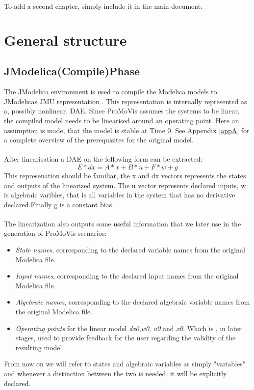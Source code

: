 To add a second chapter, simply include it in the main document.

\section{General structure}
\subsection{JModelica(Compile)Phase}
The JModelica environment is used to compile the Modelica models to JModelicas JMU representation \cite{jmodelicaorg}\nocite{*}. This representation is internally represented as a, possibly nonlinear, DAE. Since ProMoVis assumes the systems to be linear, the compiled model needs to be linearised around an operating point. Here an assumption is made, that the model is stable at Time 0. See Appendix \ref{appA} for a complete overview of the prerequisites for the original model.\\\\After linearisation a DAE on the following form can be extracted:
\begin{equation}
E*dx = A*x + B*u + F*w + g
\end{equation}
This represenation should be familiar, the x and dx vectors represents the states and outputs of the linearized system. The u vector represents declared inputs, w is algebraic varibles, that is all variables in the system that has no derivative declared.Finally g is a constant bias.\\\\The linearization also outputs some useful information that we later use in the generation of ProMoVis scenarios:
\begin{itemize}
\item \textit{State names}, corresponding to the declared variable names from the original Modelica file.
\item \textit{Input names}, corresponding to the declared input names from the original Modelica file.
\item \textit{Algebraic names}, corresponding to the declared algebraic variable names from the original Modelica file.
\item \textit{Operating points} for the linear model \textit{dx0},\textit{w0}, \textit{u0} and \textit{x0}. Which is , in later stages, used to provide feedback for the user regarding the validity of the resulting model.
\end{itemize}
From now on we will refer to states and algebraic variables as simply "variables" and whenever a distinction between the two is needed, it will be explicitly declared. 

